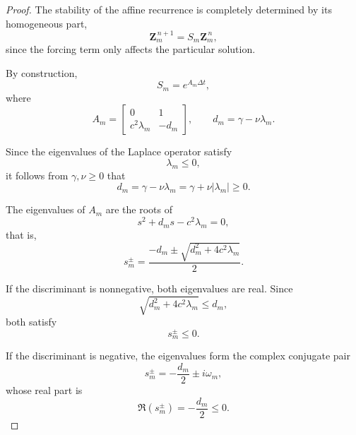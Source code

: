\documentclass{Configuration_Files/PoliMi3i_thesis}
\begin{document}
\begin{proof}
The stability of the affine recurrence is completely determined by its
homogeneous part,
\begin{equation*}
\mathbf Z_m^{\,n+1}
=
S_m
\mathbf Z_m^{\,n},
\end{equation*}
since the forcing term only affects the particular solution.

By construction,
\begin{equation*}
S_m
=
e^{A_m\Delta t},
\end{equation*}
where
\begin{equation*}
A_m
=
\begin{bmatrix}
0 & 1\\
c^2\lambda_m & -d_m
\end{bmatrix},
\qquad
d_m
=
\gamma-\nu\lambda_m.
\end{equation*}

Since the eigenvalues of the Laplace operator satisfy
\begin{equation*}
\lambda_m\le0,
\end{equation*}
it follows from $\gamma,\nu\ge0$ that
\begin{equation*}
d_m
=
\gamma-\nu\lambda_m
=
\gamma+\nu|\lambda_m|
\ge0.
\end{equation*}

The eigenvalues of $A_m$ are the roots of
\begin{equation*}
s^2+d_ms-c^2\lambda_m=0,
\end{equation*}
that is,
\begin{equation*}
s_m^\pm
=
\frac{
-d_m
\pm
\sqrt{d_m^2+4c^2\lambda_m}
}{2}.
\end{equation*}

If the discriminant is nonnegative, both eigenvalues are real. Since
\begin{equation*}
\sqrt{d_m^2+4c^2\lambda_m}
\le d_m,
\end{equation*}
both satisfy
\begin{equation*}
s_m^\pm\le0.
\end{equation*}

If the discriminant is negative, the eigenvalues form the complex conjugate
pair
\begin{equation*}
s_m^\pm
=
-\frac{d_m}{2}
\pm
i\omega_m,
\end{equation*}
whose real part is
\begin{equation*}
\Re(s_m^\pm)
=
-\frac{d_m}{2}
\le0.
\end{equation*}


\end{proof}
\end{document}
